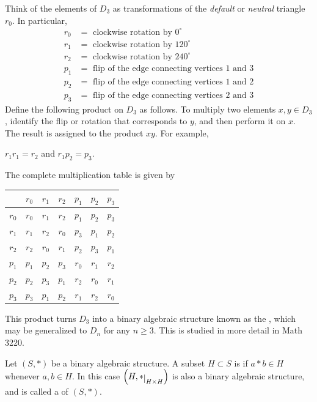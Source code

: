 \documentclass[11pt,fleqn,dvipsnames,usenames]{article}
\newcommand{\p}{\noindent}
\begin{document}
\begin{examples}
\begin{enumerate}[(a)]
\p Think of the elements of $D_3$ as transformations of the \emph{default} or \emph{neutral} triangle $r_{0}$.  In particular,
\begin{align*}
r_0 &= \text{ clockwise rotation by }0^{\circ}\\
r_1 &= \text{ clockwise rotation by }120^{\circ}\\
r_2 &= \text{ clockwise rotation by }240^{\circ}\\
p_1 &= \text{ flip of the edge connecting vertices }1\text{ and }3\\
p_2 &= \text{ flip of the edge connecting vertices }1\text{ and }2\\
p_3 &= \text{ flip of the edge connecting vertices }2\text{ and }3
\end{align*}
\p Define the following product on $D_{3}$ as follows.  To multiply two elements $x,y\in D_3$, identify the flip or rotation that corresponds to $y$, and then perform it on $x$.  The result is assigned to the product $xy$.  For example,
\begin{center}
$r_{1}r_{1} = r_{2}$ and $r_{1}p_{2} = p_{3}$.
\end{center}
\p The complete multiplication table is given by
\bgroup
\begin{center}
\def\arraystretch{1.5}
\begin{tabular}{c|cccccc}
 & $r_{0}$ & $r_{1}$ & $r_{2}$ & $p_{1}$ & $p_{2}$ & $p_{3}$\\
\hline
$r_{0}$ & $r_{0}$ & $r_{1}$ & $r_{2}$ & $p_{1}$ & $p_{2}$ & $p_{3}$\\
$r_{1}$ & $r_{1}$ & $r_{2}$ & $r_{0}$ & $p_{3}$ & $p_{1}$ & $p_{2}$\\
$r_{2}$ & $r_{2}$ & $r_{0}$ & $r_{1}$ & $p_{2}$ & $p_{3}$ & $p_{1}$\\
$p_{1}$ & $p_{1}$ & $p_{2}$ & $p_{3}$ & $r_{0}$ & $r_{1}$ & $r_{2}$\\
$p_{2}$ & $p_{2}$ & $p_{3}$ & $p_{1}$ & $r_{2}$ & $r_{0}$ &$r_{1}$\\
$p_{3}$ & $p_{3}$ & $p_{1}$ & $p_{2}$ & $r_{1}$ & $r_{2}$ & $r_{0}$
\end{tabular}
\end{center}
\egroup
\p This product turns $D_{3}$ into a binary algebraic structure known as the , which may be generalized to $D_n$ for any $n\geq 3$.  This is studied in more detail in Math 3220.  
\end{enumerate}
\end{examples}
%
\begin{definition}
Let $(S,*)$ be a binary algebraic structure.  A subset $H\subset S$ is  if $a*b\in H$ whenever $a,b\in H$.  In this case $\left(H,*\restrict{H\times H}\right)$ is also a binary algebraic structure, and is called a  of $(S,*)$.
\end{definition}
\end{document}
